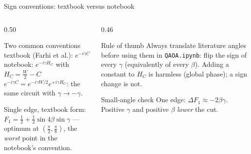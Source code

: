 \documentclass[aspectratio=169,11pt]{beamer}
\newcommand{\hl}[1]{{\color{qorange}\textbf{#1}}}
\begin{document}
\begin{frame}{Sign conventions: textbook versus notebook}
  \begin{columns}[T]
    \begin{column}{0.50\textwidth}
      \begin{block}{Two common conventions}
        \small
        textbook (Farhi et al.): $e^{-i\gamma C}$\\
        notebook: $e^{-i\gamma H_C}$ with $H_C = \frac W2 - C$\\[1mm]
        $e^{-i\gamma C} = e^{-i\gamma W/2}e^{+i\gamma H_C}$: the same circuit with \hl{$\gamma \to -\gamma$}.
      \end{block}
      Single edge, textbook form: $F_1 = \tfrac12 + \tfrac12\sin4\beta\sin\gamma$ --- optimum at $(\frac\pi2, \frac\pi8)$,
      the \emph{worst} point in the notebook's convention.
    \end{column}
    \begin{column}{0.46\textwidth}
      \begin{alertblock}{Rule of thumb}
        Always translate literature angles before using them in \texttt{QAOA.ipynb}: flip the sign of every $\gamma$
        (equivalently of every $\beta$). Adding a constant to $H_C$ is harmless (global phase); a sign change is not.
      \end{alertblock}
      \begin{block}{Small-angle check}
        One edge: $\Delta F_1 \approx -2\beta\gamma$. Positive $\gamma$ and positive $\beta$ \emph{lower} the cut.
      \end{block}
    \end{column}
  \end{columns}
\end{frame}
\end{document}
